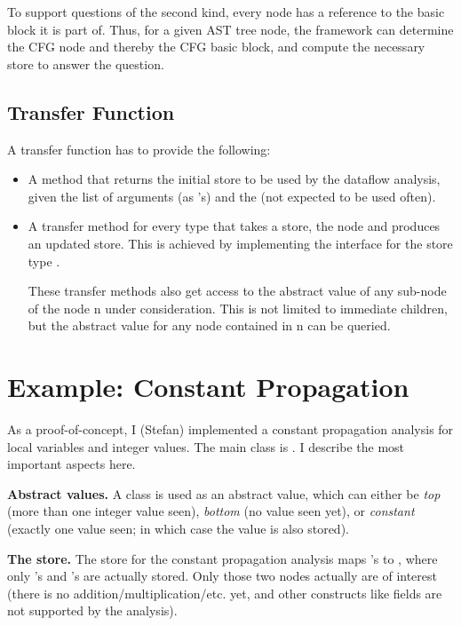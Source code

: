 To support questions of the second kind, every node has a reference
to the basic block it is part of. Thus, for a given AST tree node, the framework
can determine the CFG node and thereby the CFG basic block, and compute the necessary store
to answer the question.



\subsection{Transfer Function}
\label{sec:transfer-fnc}

A transfer function has to provide the following:
\begin{itemize}
\item A method that returns the initial store to be used by the dataflow analysis, given
the list of arguments (as 's) and the  (not expected to be used often).
\item A transfer method for every  type that takes a store, the node and produces
an updated store. This is achieved by implementing the  interface
for the store type .

These transfer methods also get access to the abstract value of any sub-node of the node \code n
under consideration.  This is not limited to immediate children, but the abstract value for any node contained
in \code n can be queried.
\end{itemize}


\section{Example: Constant Propagation}

    As a proof-of-concept, I (Stefan) implemented a constant propagation analysis for local variables
    and integer values.  The main class is 
    . 
    I describe the most important aspects here.
    
    \textbf{Abstract values.} A class  is used as an abstract value, which can
    either be \emph{top} (more than one integer value seen), \emph{bottom} (no value seen yet),
    or \emph{constant} (exactly one value seen; in which case the value is also stored).
    
    \textbf{The store.} The store for the constant propagation analysis maps 's to ,
    where only 's and 's are actually stored. Only those
    two nodes actually are of interest (there is no addition/multiplication/etc. yet, and other constructs like
    fields are not supported by the analysis).
    
